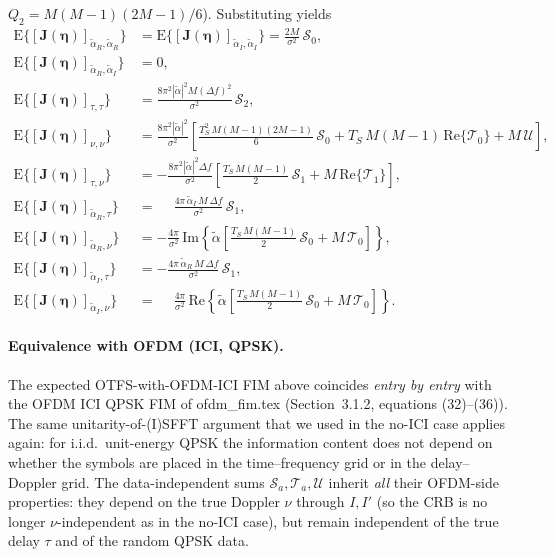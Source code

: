 \documentclass[11pt]{article}
\begin{document}
\(Q_2 = M(M-1)(2M-1)/6\)). Substituting yields
\begin{align}
    \mathrm{E}\{[\bm{J}(\bm{\eta})]_{\tilde{\alpha}_R, \tilde{\alpha}_R}\} &=
        \mathrm{E}\{[\bm{J}(\bm{\eta})]_{\tilde{\alpha}_I, \tilde{\alpha}_I}\} =
        \tfrac{2M}{\sigma^2}\,\mathcal{S}_0, \\
    \mathrm{E}\{[\bm{J}(\bm{\eta})]_{\tilde{\alpha}_R, \tilde{\alpha}_I}\} &= 0, \\
    \mathrm{E}\{[\bm{J}(\bm{\eta})]_{\tau,\tau}\} &=
        \tfrac{8\pi^2 |\tilde{\alpha}|^2 M (\Delta f)^2}{\sigma^2}\,\mathcal{S}_2, \\
    \mathrm{E}\{[\bm{J}(\bm{\eta})]_{\nu,\nu}\} &=
        \tfrac{8\pi^2 |\tilde{\alpha}|^2}{\sigma^2}\!\left[
            \tfrac{T_S^2\, M(M-1)(2M-1)}{6}\,\mathcal{S}_0
          + T_S\, M(M-1)\,\text{Re}\{\mathcal{T}_0\}
          + M\,\mathcal{U}\right], \\
    \mathrm{E}\{[\bm{J}(\bm{\eta})]_{\tau,\nu}\} &=
        -\tfrac{8\pi^2 |\tilde{\alpha}|^2 \Delta f}{\sigma^2}\!\left[
            \tfrac{T_S\, M(M-1)}{2}\,\mathcal{S}_1
          + M\,\text{Re}\{\mathcal{T}_1\}\right], \\
    \mathrm{E}\{[\bm{J}(\bm{\eta})]_{\tilde{\alpha}_R, \tau}\} &=
        \phantom{-}\tfrac{4\pi\,\tilde{\alpha}_I\, M\,\Delta f}{\sigma^2}\,
        \mathcal{S}_1, \\
    \mathrm{E}\{[\bm{J}(\bm{\eta})]_{\tilde{\alpha}_R, \nu}\} &=
        -\tfrac{4\pi}{\sigma^2}\,\text{Im}\!\left\{\tilde{\alpha}\!\left[
            \tfrac{T_S\, M(M-1)}{2}\,\mathcal{S}_0 + M\,\mathcal{T}_0\right]\right\}, \\
    \mathrm{E}\{[\bm{J}(\bm{\eta})]_{\tilde{\alpha}_I, \tau}\} &=
        -\tfrac{4\pi\,\tilde{\alpha}_R\, M\,\Delta f}{\sigma^2}\,
        \mathcal{S}_1, \\
    \mathrm{E}\{[\bm{J}(\bm{\eta})]_{\tilde{\alpha}_I, \nu}\} &=
        \phantom{-}\tfrac{4\pi}{\sigma^2}\,\text{Re}\!\left\{\tilde{\alpha}\!\left[
            \tfrac{T_S\, M(M-1)}{2}\,\mathcal{S}_0 + M\,\mathcal{T}_0\right]\right\}.
\end{align}

\paragraph{Equivalence with OFDM (ICI, QPSK).} The expected
OTFS-with-OFDM-ICI FIM above coincides \emph{entry by entry} with the
OFDM ICI QPSK FIM of ofdm\_fim.tex (Section~3.1.2, equations
(32)--(36)). The same unitarity-of-(I)SFFT argument that we used in
the no-ICI case applies again: for i.i.d.\ unit-energy QPSK the
information content does not depend on whether the symbols are placed
in the time--frequency grid or in the delay--Doppler grid. The
data-independent sums \(\mathcal{S}_a,\mathcal{T}_a,\mathcal{U}\)
inherit \emph{all} their OFDM-side properties: they depend on the
true Doppler \(\nu\) through \(I,I'\) (so the CRB is no longer
\(\nu\)-independent as in the no-ICI case), but remain independent of
the true delay \(\tau\) and of the random QPSK data.
\end{document}

